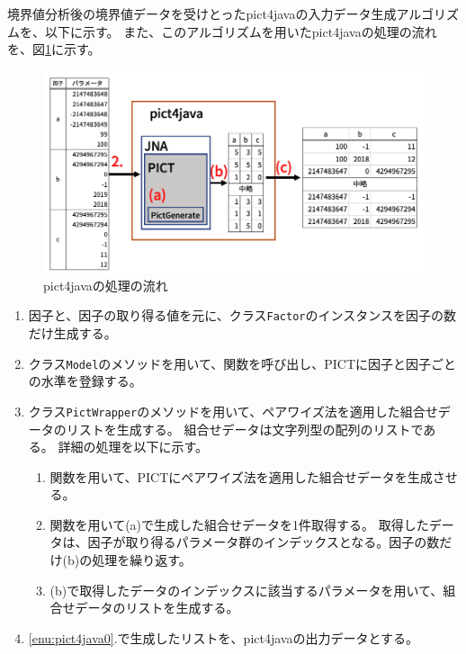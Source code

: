 \documentclass[uplatex, report, a4j, 10pt]{jsbook}
\newcommand\ttt[1]{\texttt{#1}}
\begin{document}
境界値分析後の境界値データを受けとったpict4javaの入力データ生成アルゴリズムを、以下に示す。
また、このアルゴリズムを用いたpict4javaの処理の流れを、図\ref{fig:pict4java}に示す。

\begin{figure}[tp]
  \centering
  \includegraphics[keepaspectratio, width=160mm]{figs/pict4java}
  \caption{pict4javaの処理の流れ}
  \label{fig:pict4java}
\end{figure}

\begin{enumerate}
  \item 因子と、因子の取り得る値を元に、クラス\ttt{Factor}のインスタンスを因子の数だけ生成する。
  \item クラス\ttt{Model}の\addFactor{}メソッドを用いて、\PictAddParameter{}関数を呼び出し、PICTに因子と因子ごとの水準を登録する。
  \item\label{enu:pict4java0} クラス\ttt{PictWrapper}の\generate{}メソッドを用いて、ペアワイズ法を適用した組合せデータのリストを生成する。
        組合せデータは文字列型の配列のリストである。
        詳細の処理を以下に示す。
        \begin{enumerate}
          \item\label{enu:pict4java1} \PictGenerate{}関数を用いて、PICTにペアワイズ法を適用した組合せデータを生成させる。
          \item\label{enu:pict4java2} \PictGetNextResultRow{}関数を用いて(a)で生成した組合せデータを1件取得する。
                取得したデータは、因子が取り得るパラメータ群のインデックスとなる。因子の数だけ(b)の処理を繰り返す。
          \item (b)で取得したデータのインデックスに該当するパラメータを用いて、組合せデータのリストを生成する。
        \end{enumerate}
  \item \ref{enu:pict4java0}.で生成したリストを、pict4javaの出力データとする。
\end{enumerate}
\end{document}
